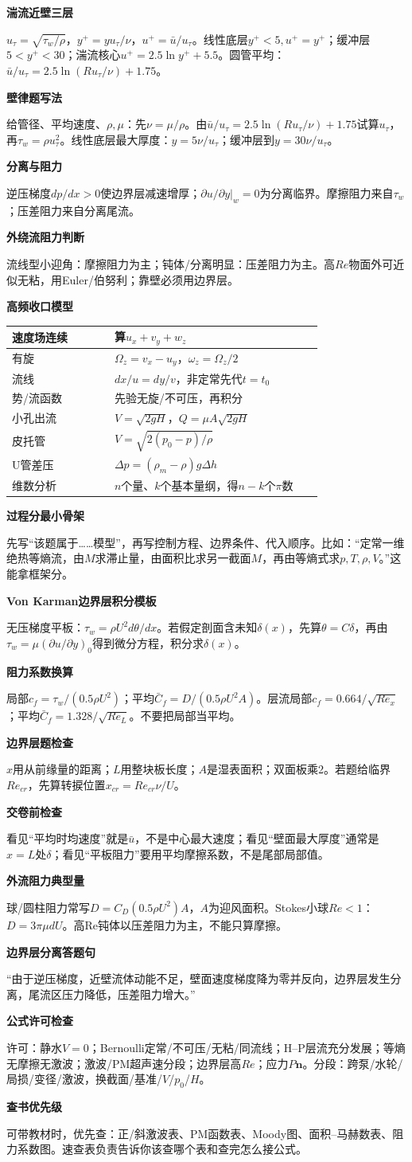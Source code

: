 \documentclass[a4paper]{article}
\newcommand{\qt}[1]{\vspace{0.25pt}\colorbox{Q}{\parbox{\dimexpr\linewidth-2\fboxsep}{\color{white}\bfseries #1}}\par}
\newcommand{\sect}[1]{\qt{#1}}
\begin{document}
\begin{multicols}{3}
{\sect{湍流近壁三层}
$u_\tau=\sqrt{\tau_w/\rho}$，$y^+=yu_\tau/\nu$，$u^+=\bar u/u_\tau$。线性底层$y^+<5,u^+=y^+$；缓冲层$5<y^+<30$；湍流核心$u^+=2.5\ln y^+ +5.5$。圆管平均：$\bar u/u_\tau=2.5\ln(Ru_\tau/\nu)+1.75$。
\sect{壁律题写法}
给管径、平均速度、$\rho,\mu$：先$\nu=\mu/\rho$。由$\bar u/u_\tau=2.5\ln(Ru_\tau/\nu)+1.75$试算$u_\tau$，再$\tau_w=\rho u_\tau^2$。线性底层最大厚度：$y=5\nu/u_\tau$；缓冲层到$y=30\nu/u_\tau$。

\sect{分离与阻力}
逆压梯度$dp/dx>0$使边界层减速增厚；$\partial u/\partial y|_w=0$为分离临界。摩擦阻力来自$\tau_w$；压差阻力来自分离尾流。
\sect{外绕流阻力判断}
流线型小迎角：摩擦阻力为主；钝体/分离明显：压差阻力为主。高$Re$物面外可近似无粘，用Euler/伯努利；靠壁必须用边界层。

\sect{高频收口模型}
\renewcommand{\arraystretch}{0.76}\begin{tabular}{|p{0.30\linewidth}|p{0.61\linewidth}|}
\hline 速度场连续 & 算$u_x+v_y+w_z$\\ \hline
有旋 & $\Omega_z=v_x-u_y$，$\omega_z=\Omega_z/2$\\ \hline
流线 & $dx/u=dy/v$，非定常先代$t=t_0$\\ \hline
势/流函数 & 先验无旋/不可压，再积分\\ \hline
小孔出流 & $V=\sqrt{2gH}$，$Q=\mu A\sqrt{2gH}$\\ \hline
皮托管 & $V=\sqrt{2(p_0-p)/\rho}$\\ \hline
U管差压 & $\Delta p=(\rho_m-\rho)g\Delta h$\\ \hline
维数分析 & $n$个量、$k$个基本量纲，得$n-k$个$\pi$数\\ \hline
\end{tabular}\renewcommand{\arraystretch}{1}

\sect{过程分最小骨架}
先写“该题属于……模型”，再写控制方程、边界条件、代入顺序。比如：“定常一维绝热等熵流，由$M$求滞止量，由面积比求另一截面$M$，再由等熵式求$p,T,\rho,V$。”这能拿框架分。
\sect{Von Karman边界层积分模板}
无压梯度平板：$\tau_w=\rho U^2d\theta/dx$。若假定剖面含未知$\delta(x)$，先算$\theta=C\delta$，再由$\tau_w=\mu(\partial u/\partial y)_0$得到微分方程，积分求$\delta(x)$。
\sect{阻力系数换算}
局部$c_f=\tau_w/(0.5\rho U^2)$；平均$\bar C_f=D/(0.5\rho U^2A)$。层流局部$c_f=0.664/\sqrt{Re_x}$；平均$\bar C_f=1.328/\sqrt{Re_L}$。不要把局部当平均。
\sect{边界层题检查}
$x$用从前缘量的距离；$L$用整块板长度；$A$是湿表面积；双面板乘2。若题给临界$Re_{cr}$，先算转捩位置$x_{cr}=Re_{cr}\nu/U$。
\sect{交卷前检查}
看见“平均时均速度”就是$\bar u$，不是中心最大速度；看见“壁面最大厚度”通常是$x=L$处$\delta$；看见“平板阻力”要用平均摩擦系数，不是尾部局部值。
\sect{外流阻力典型量}
球/圆柱阻力常写$D=C_D(0.5\rho U^2)A$，$A$为迎风面积。Stokes小球$Re<1$：$D=3\pi\mu dU$。高Re钝体以压差阻力为主，不能只算摩擦。
\sect{边界层分离答题句}
“由于逆压梯度，近壁流体动能不足，壁面速度梯度降为零并反向，边界层发生分离，尾流区压力降低，压差阻力增大。”
\sect{公式许可检查}
许可：静水$V=0$；Bernoulli定常/不可压/无粘/同流线；H--P层流充分发展；等熵无摩擦无激波；激波/PM超声速分段；边界层高$Re$；应力$P\bm n$。分段：跨泵/水轮/局损/变径/激波，换截面/基准/$V$/$p_0$/$H$。
\sect{查书优先级}
可带教材时，优先查：正/斜激波表、PM函数表、Moody图、面积--马赫数表、阻力系数图。速查表负责告诉你该查哪个表和查完怎么接公式。

}
\end{multicols}
\end{document}
